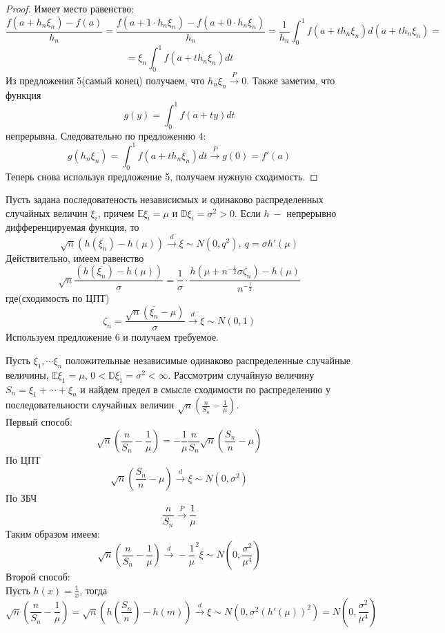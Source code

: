 \begin{proof}
Имеет место равенство:
\[
    \frac{f\left(a + h_n \xi_n\right) - f\left(a\right)}{h_n} =
    \frac{f\left(a + 1\cdot h_n \xi_n\right) - f\left(a + 0 \cdot h_n \xi_n\right)}{h_n} = 
    \frac1{h_n} \int_{0}^{1} f\left(a + t h_n \xi_n\right) d\left(a + t h_n \xi_n\right) =
    \]
    \[
    = \xi_n \int_0^1 f\left(a + t h_n \xi_n\right) dt
\]
Из предложения 5(самый конец) получаем, что $h_n \xi_n \xrightarrow{P} 0$.
Также заметим, что функция
\[
    g\left(y\right) = \int_0^1 f(a + ty) dt
\]
непрерывна. Следовательно по предложению 4:
\[
    g\left(h_n \xi_n\right) = \int_0^1 f\left(a + t h_n \xi_n\right) dt \xrightarrow{P} g(0) = f'\left(a\right)
\]
Теперь снова используя предложение 5, получаем нужную сходимость.
\end{proof}

\begin{example}
Пусть задана последоватеность независисмых и одинаково распределенных случайных величин $\xi_i$, причем 
$ \mathbb{E}  \xi_i = \mu$ и $ \mathbb{D} \xi_i = \sigma ^ 2 > 0$. Если $h \ - $ непрерывно дифференцируемая функция, то
\[
    \sqrt{n}  \left(h\left(\overline{\xi_n}\right) - h\left(\mu\right)\right) \xrightarrow{d} \xi \sim N\left(0, q ^ 2\right), \ q = \sigma h'\left(\mu\right)
\]
Действительно, имеем равенство
\[
    \sqrt{n} \frac{\left(h\left(\overline{\xi_n}\right) - h\left(\mu\right)\right)}{\sigma} = 
    \frac1{\sigma} \cdot \frac{h\left(\mu + n ^ {-\frac12} \sigma \zeta_n\right) - h\left(\mu\right)}{n ^ {-\frac12}}
\]
где(сходимость по ЦПТ)
\[
    \zeta_n = \frac{\sqrt{n} \left(\overline{\xi_n}- \mu\right)}{\sigma} \xrightarrow{d} \xi \sim N\left(0, 1\right)
\]
Используем предложение 6 и получаем требуемое.
\end{example}

\begin{example}
Пусть $\xi_1, \cdots \xi_n$ положительные независимые одинаково распределенные случайные величины, 
$ \mathbb{E}  \xi_1 = \mu$, $0 <  \mathbb{D} \xi_1 = \sigma ^ 2 < \infty$.
Рассмотрим случайную величину $S_n = \xi_1 + \cdots + \xi_n$ и найдем предел в смысле сходимости по распределению у последовательности случайных величин
$\sqrt{n} \left(\frac{n}{S_n} - \frac1\mu\right)$.\\
Первый способ:
\[
    \sqrt{n} \left(\frac{n}{S_n} - \frac1\mu\right) = -\frac1\mu \frac{n}{S_n} \sqrt{n} \left(\frac{S_n}{n} - \mu\right)
\]
По ЦПТ
\[
    \sqrt{n} \left(\frac{S_n}{n} - \mu\right) \xrightarrow{d} \xi \sim N\left(0, \sigma ^ 2\right)
\]
По ЗБЧ
\[
    \frac{n}{S_n} \xrightarrow{P} \frac1\mu
\]
Таким образом имеем:
\[
    \sqrt{n} \left(\frac{n}{S_n} - \frac1\mu\right) \xrightarrow{d} -\frac1\mu ^2  \xi \sim N\left(0, \frac{\sigma ^ 2}{\mu ^ 4}\right)
\]
Второй способ: \\
Пусть $h\left(x\right) = \frac1x$, тогда 
\[
    \sqrt{n} \left(\frac{n}{S_n} - \frac1\mu\right) = \sqrt{n} \left(h\left(\frac{S_n}{n}\right) - h\left(m\right)\right)
    \xrightarrow{d} \xi \sim N\left(0, \sigma ^2 \left(h'\left(\mu\right)\right) ^ 2\right) = N\left(0, \frac{\sigma ^ 2}{\mu ^ 4}\right)
\]

\end{example}

